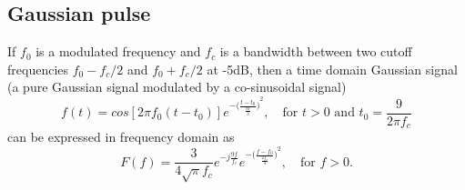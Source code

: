     \subsection{Gaussian pulse} \label{subsec:Gaussian pulse}
If $f_0$ is a modulated frequency and $f_c$ is a bandwidth between  two cutoff frequencies $f_0-f_c/2$ and  $f_0+f_c/2$ at -5dB, then a time domain Gaussian signal (a pure Gaussian signal modulated by a co-sinusoidal signal)
\begin{equation}\label{equ:GussianSignal_time}
 f(t)=cos[2\pi f_0(t-t_0)]e^{-{\big(\frac{t-t_0}{\frac{t0}{3}}\big)}^2}, \quad \text{for } t>0 \text{ and }t_0=\frac{9}{2\pi f_c}
\end{equation}
can be expressed  in frequency domain as
\begin{equation}\label{equ:GussianSignal_freq}
F(f)=\frac{3}{4\sqrt{\pi}f_c}e^{-j\frac{9f}{f_c}}e^{-{\big(\frac{f-f_0}{\frac{2f_c}{3}}\big)}^2},\quad \text{for } f>0 .
\end{equation}

